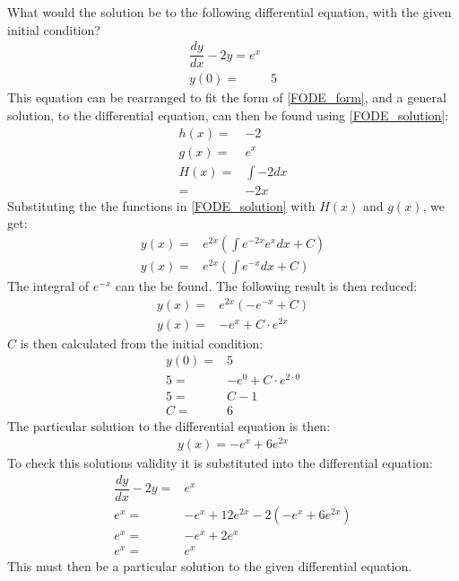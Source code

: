\begin{tcolorbox}[colback=red!5!white,colframe=red!55!black,title=Example of solving a separable differential equation] 

What would the solution be to the following differential equation, with the given initial condition?
\begin{align*}
	\dfrac{dy}{dx}-2y=e^x \\
	y(0) =& 5
\end{align*}
This equation can be rearranged to fit the form of \eqref{FODE_form}, and a general solution, to the differential equation, can then be found using \eqref{FODE_solution}:
\begin{align*}
	h(x) =& -2 \\
	g(x) =& e^x \\
	H(x) =& \int{-2 dx} \\
	     =& -2x
\end{align*}
Substituting the the functions in \eqref{FODE_solution} with $H(x)$ and $g(x)$, we get: 
\begin{align*}
	y(x)=&e^{2x}(\int{e^{-2x}e^x dx}+C) \\
	y(x)=&e^{2x}(\int{e^{-x} dx}+C)
\end{align*}
The integral of $e^{-x}$ can the be found. The following result is then reduced:
\begin{align*}
	y(x)=&e^{2x}(-e^{-x}+C) \\
	y(x)=&-e^x+C \cdot e^{2x}
\end{align*}
$C$ is then calculated from the initial condition:
\begin{align*}
	y(0)=&5 \\
	5=&-e^0+C \cdot e^{2 \cdot 0} \\
	5 =& C-1 \\
	C =& 6
\end{align*}
The particular solution to the differential equation is then:
\begin{align*}
	y(x) = -e^x+6e^{2x}
\end{align*}
To check this solutions validity it is substituted into the differential equation:
\begin{align*}
	\dfrac{dy}{dx} -2y =& e^x \\
	e^x =& -e^x+12e^{2x} -2(-e^x+6e^{2x})  \\
	e^x =& -e^x+2e^x  \\
	e^x =& e^x
\end{align*}
This must then be a particular solution to the given differential equation.
\end{tcolorbox}

